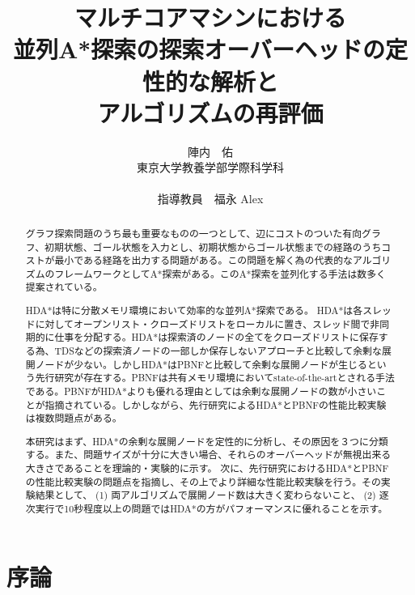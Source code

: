 \documentclass[uplatex]{jsarticle}
\title{マルチコアマシンにおける\\
並列A*探索の探索オーバーヘッドの定性的な解析と\\
アルゴリズムの再評価}
\author{陣内　佑 \\
東京大学教養学部学際科学科\\
\\
指導教員　福永 Alex}
\begin{document}
\maketitle
\thispagestyle{empty}

\begin{abstract}
グラフ探索問題のうち最も重要なものの一つとして、辺にコストのついた有向グラフ、初期状態、ゴール状態を入力とし、初期状態からゴール状態までの経路のうちコストが最小である経路を出力する問題がある。この問題を解く為の代表的なアルゴリズムのフレームワークとしてA*探索がある。このA*探索を並列化する手法は数多く提案されている。

HDA*は特に分散メモリ環境において効率的な並列A*探索である。
HDA*は各スレッドに対してオープンリスト・クローズドリストをローカルに置き、スレッド間で非同期的に仕事を分配する。HDA*は探索済のノードの全てをクローズドリストに保存する為、TDSなどの探索済ノードの一部しか保存しないアプローチと比較して余剰な展開ノードが少ない。しかしHDA*はPBNFと比較して余剰な展開ノードが生じるという先行研究が存在する。PBNFは共有メモリ環境においてstate-of-the-artとされる手法である。PBNFがHDA*よりも優れる理由としては余剰な展開ノードの数が小さいことが指摘されている。しかしながら、先行研究によるHDA*とPBNFの性能比較実験は複数問題点がある。

本研究はまず、HDA*の余剰な展開ノードを定性的に分析し、その原因を３つに分類する。また、問題サイズが十分に大きい場合、それらのオーバーヘッドが無視出来る大きさであることを理論的・実験的に示す。
次に、先行研究におけるHDA*とPBNFの性能比較実験の問題点を指摘し、その上でより詳細な性能比較実験を行う。その実験結果として、 (1) 両アルゴリズムで展開ノード数は大きく変わらないこと、 (2) 逐次実行で10秒程度以上の問題ではHDA*の方がパフォーマンスに優れることを示す。
\end{abstract}

\newpage
\tableofcontents
\thispagestyle{empty}
\newpage

\section{序論}
\setcounter{page}{1}
\end{document}
